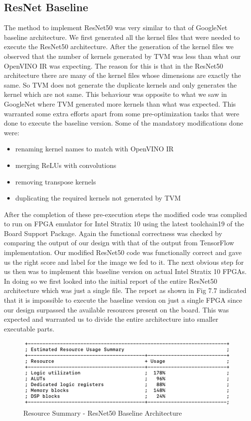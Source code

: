 \subsection{ResNet Baseline}
The method to implement ResNet50 was very similar to that of GoogleNet baseline architecture. We first generated all the kernel files that were needed to execute the ResNet50 architecture. After the generation of the kernel files we observed that the number of kernels generated by TVM was less than what our OpenVINO IR was expecting. The reason for this is that in the ResNet50 architecture there are many of the kernel files whose dimensions are exactly the same. So TVM does not generate the duplicate kernels and only generates the kernel which are not same. This behaviour was opposite to what we saw in GoogleNet where TVM generated more kernels than what was expected. This warranted some extra efforts apart from some pre-optimization tasks that were done to execute the baseline version.
Some of the mandatory modifications done were:
\begin{itemize}
    \item renaming kernel names to match with OpenVINO IR
    \item merging ReLUs with convolutions
    \item removing transpose kernels
    \item duplicating the required kernels not generated by TVM
\end{itemize}
 After the completion of these pre-execution steps the modified code was complied to run on FPGA emulator for Intel Stratix 10 using the latest toolchain19 of the Board Support Package. Again the functional correctness was checked by comparing the output of our design with that of the output from TensorFlow implementation. Our modified ResNet50 code was functionally correct and gave us the right score and label for the image we fed to it. The next obvious step for us then was to implement this baseline version on actual Intel Stratix 10 FPGAs.
 \newline
 In doing so we first looked into the initial report of the entire ResNet50 architecture which was just a single file. The report as shown in Fig 7.7 indicated that it is impossible to execute the baseline version on just a single FPGA since our design surpassed the available resources present on the board. This was expected and warranted us to divide the entire architecture into smaller executable parts.
 \begin{figure}[!htb]
  \includegraphics[width=\textwidth,height=\textheight,keepaspectratio]{img/ResNet_baseline.png}
  \caption{Resource Summary - ResNet50 Baseline Architecture}
  \label{fig:ResNet50_baseline}
\end{figure}
